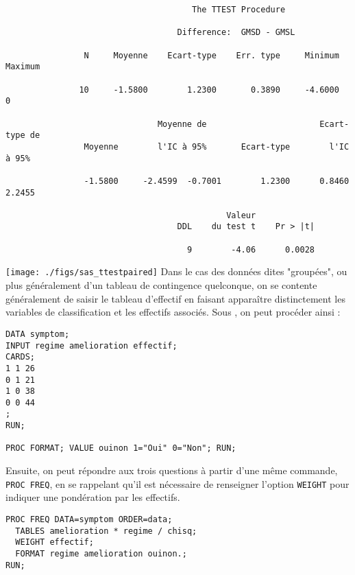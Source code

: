 \begin{verbatim}
                                      The TTEST Procedure

                                   Difference:  GMSD - GMSL

                N     Moyenne    Ecart-type    Err. type     Minimum     Maximum

               10     -1.5800        1.2300       0.3890     -4.6000           0

                               Moyenne de                       Ecart-type de
                Moyenne        l'IC à 95%       Ecart-type        l'IC à 95%

                -1.5800     -2.4599  -0.7001        1.2300      0.8460   2.2455

                                             Valeur
                                   DDL    du test t    Pr > |t|

                                     9        -4.06      0.0028
\end{verbatim}

\texttt{[image: ./figs/sas\_ttestpaired]}
%
%
%
\soln{\ref{exo:9.3}}
Dans le cas des données dites "groupées", ou plus généralement d'un tableau
de contingence quelconque, on se contente généralement de saisir le tableau
d'effectif en faisant apparaître distinctement les variables de
classification et les effectifs associés. Sous \SAS, on peut procéder ainsi :
\begin{verbatim}
DATA symptom;
INPUT regime amelioration effectif;
CARDS;
1 1 26
0 1 21
1 0 38
0 0 44
;
RUN;

PROC FORMAT; VALUE ouinon 1="Oui" 0="Non"; RUN;
\end{verbatim}

Ensuite, on peut répondre aux trois questions à partir d'une même commande,
\texttt{PROC FREQ}, en se rappelant qu'il est nécessaire de renseigner
l'option \texttt{WEIGHT} pour indiquer une pondération par les effectifs.
\begin{verbatim}
PROC FREQ DATA=symptom ORDER=data;
  TABLES amelioration * regime / chisq;
  WEIGHT effectif;
  FORMAT regime amelioration ouinon.;
RUN;
\end{verbatim}

